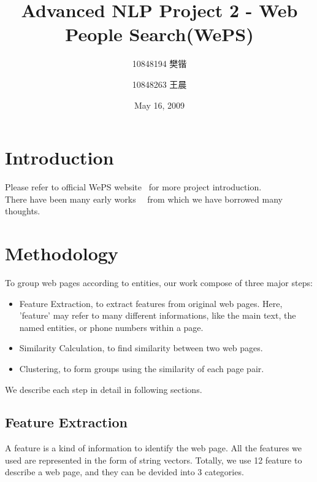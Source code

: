 \documentclass{article}
\begin{document}
\begin{CJK}{UTF8}{gbsn}

\title{Advanced NLP Project 2 - Web People Search(WePS)}
\author{10848194 樊锴 \and 10848263 王晨}
\date{May 16, 2009}

\maketitle

\section{Introduction}

    Please refer to official WePS website~\cite{weps} for more project introduction. \\
    There have been many early works~\cite{fleischman_multi-document_2004}~\cite{mann_unsupervised_2003} from which we have borrowed many thoughts.

\section{Methodology}

    To group web pages according to entities, our work compose of three major steps: 
    \begin{itemize}
    \item Feature Extraction, to extract features from original web pages. Here, 'feature' may refer to many different informations, like the main text, the named entities, or phone numbers within a page.
    \item Similarity Calculation, to find similarity between two web pages.
    \item Clustering, to form groups using the similarity of each page pair.
    \end{itemize}
    We describe each step in detail in following sections.

    \subsection{Feature Extraction}
        A feature is a kind of information to identify the web page. All the features we used are represented in the form of string vectors.
        Totally, we use 12 feature to describe a web page, and they can be devided into 3 categories.


\end{CJK}
\end{document}
